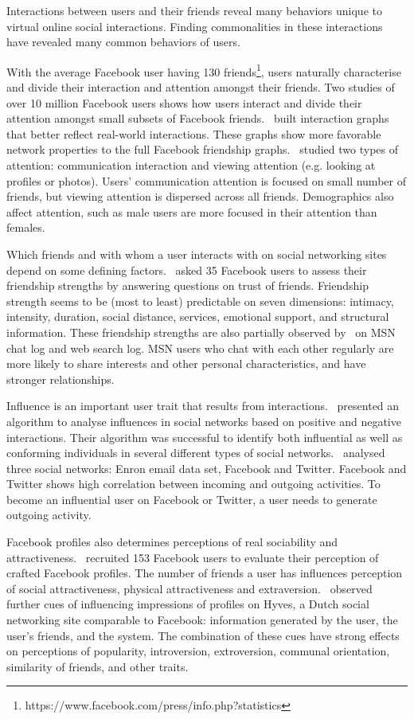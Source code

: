 \documentclass[letterpaper]{article}
\begin{document}
Interactions between users and their friends reveal many behaviors unique to virtual online social interactions. Finding commonalities in these interactions have revealed many common behaviors of users.


With the average Facebook user having 130 friends\footnote{https://www.facebook.com/press/info.php?statistics}, users naturally characterise and divide their interaction and attention amongst their friends. Two studies of over 10 million Facebook users shows how users interact and divide their attention amongst small subsets of Facebook friends.~\cite{wilson2009user} built interaction graphs that better reflect real-world interactions. These graphs show more favorable network properties to the full Facebook friendship graphs.~\cite{backstrom2011center} studied two types of attention: communication interaction and viewing attention (e.g. looking at profiles or photos). Users' communication attention is focused on small number of friends, but viewing attention is dispersed across all friends. Demographics also affect attention, such as male users are more focused in their attention than females.


Which friends and with whom a user interacts with on social networking sites depend on some defining factors.~\cite{gilbert2009predicting} asked 35 Facebook users to assess their friendship strengths by answering questions on trust of friends. Friendship strength seems to be (most to least) predictable on seven dimensions: intimacy, intensity, duration, social distance, services, emotional support, and structural information. These friendship strengths are also partially observed by~\cite{singla2008yes} on MSN chat log and web search log. MSN users who chat with each other regularly are more likely to share interests and other personal characteristics, and have stronger relationships.


Influence is an important user trait that results from interactions.~\cite{li2011casino} presented an algorithm to analyse influences in social networks based on positive and negative interactions. Their algorithm was successful to identify both influential as well as conforming individuals in several different types of social networks.~\cite{saez2011high} analysed three social networks: Enron email data set, Facebook and Twitter. Facebook and Twitter shows high correlation between incoming and outgoing activities. To become an influential user on Facebook or Twitter, a user needs to generate outgoing activity.


Facebook profiles also determines perceptions of real sociability and attractiveness.~\cite{tong2008too} recruited 153 Facebook users to evaluate their perception of crafted Facebook profiles. The number of friends a user has influences perception of social attractiveness, physical attractiveness and extraversion.~\cite{utz2010showme} observed further cues of influencing impressions of profiles on Hyves, a Dutch social networking site comparable to Facebook: information generated by the user, the user’s friends, and the system. The combination of these cues have strong effects on perceptions of popularity, introversion, extroversion, communal orientation, similarity of friends, and other traits.
\end{document}
